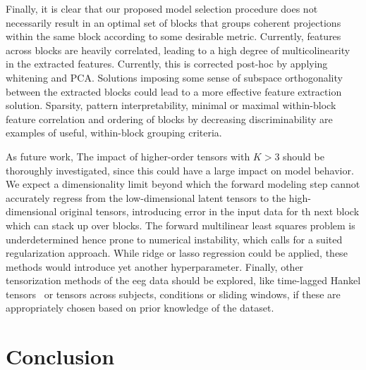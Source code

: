 \documentclass[twocolumn]{article}
\begin{document}
Finally, it is clear that our proposed model selection procedure does not
necessarily result in an optimal set of blocks that groups coherent
projections within the same block according to some desirable metric.
Currently, features across blocks are heavily correlated, leading to a high
degree of multicolinearity in the extracted features.
Currently, this is corrected  post-hoc by applying whitening and PCA.
Solutions imposing some sense of subspace orthogonality between the extracted
blocks could lead to a more effective feature extraction solution.
Sparsity, pattern interpretability, minimal or maximal within-block feature
correlation and ordering of blocks by decreasing discriminability are
examples of useful, within-block grouping criteria.


As future work, The impact of higher-order tensors with $K>3$ should be thoroughly
investigated, since this could have a large impact on model behavior.
We expect a dimensionality limit beyond which the forward modeling step cannot
accurately regress from the low-dimensional latent tensors to the
high-dimensional original tensors, introducing error in the input data for th
next block which can stack up over blocks.
The forward multilinear least squares problem is underdetermined hence prone to
numerical instability, which calls for a suited regularization approach.
While ridge or lasso regression could be applied, these methods would introduce
yet another hyperparameter.
Finally, other tensorization methods of the \ac{eeg} data should be explored,
like time-lagged Hankel tensors~\cite{Papy2005} or tensors across subjects,
conditions or sliding windows, if these are appropriately chosen based on prior
knowledge of the dataset.

\section{Conclusion}
\end{document}

